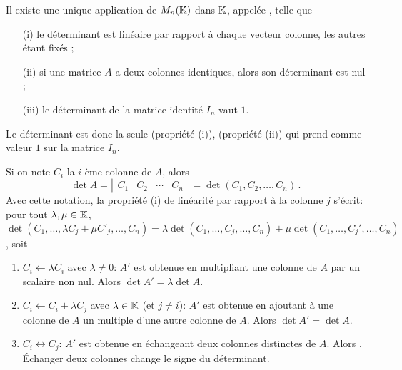 \documentclass[10pt,class=article,crop=false]{standalone}
\begin{document}
\begin{multicols}{2}
\begin{theoreme}
	\label{th:def:determinant}
	Il existe une unique application de $M_n(\mathbb{K})$ dans $\mathbb{K}$,
	appelée , telle que
	\begin{itemize}
		\item[(i)] le déterminant est linéaire par rapport à chaque
		vecteur colonne, les autres étant fixés ;
		\item[(ii)] si une matrice $A$ a deux colonnes identiques,
		alors son déterminant est nul ;
		\item[(iii)] le déterminant de la matrice identité $I_n$ vaut $1$.
	\end{itemize}
\end{theoreme}

Le déterminant est donc la seule  (propriété (i)),    (propriété (ii)) qui prend comme valeur $1$ sur la matrice
$I_n$.

Si on note $C_{i}$ la $i$-ème colonne de $A$, alors
$$\det A=\left|\begin{matrix}
	C_1&C_2&\cdots&C_n
\end{matrix}\right|
= \det (C_1,C_2,\ldots,C_n) \,.
$$
Avec cette notation, la propriété (i) de linéarité par rapport à la colonne $j$ s'écrit:
pour tout $\lambda,\mu \in \mathbb{K}$,
$\det (C_1,\ldots,\lambda C_j + \mu C'_j,\ldots, C_n)
= \lambda  \det (C_1,\ldots,C_j,\ldots, C_n)+ \mu \det (C_1,\ldots,C_j',\ldots, C_n)$, soit



\begin{proposition}
\sauteligne
\begin{enumerate}
	\item $C_i \leftarrow \lambda C_i$ avec $\lambda \neq 0$:
	$A'$ est obtenue en multipliant une colonne de $A$ par un scalaire non nul.
	Alors $\det A' = \lambda \det A$.
	
	\item $C_i \leftarrow C_i+\lambda C_j$ avec $\lambda \in \mathbb{K}$ (et $j\neq i$):
	$A'$ est obtenue en ajoutant à une colonne de $A$ un multiple d'une autre colonne de $A$.
	Alors $\det A' = \det A$.
	
	\item $C_i \leftrightarrow C_j$: $A'$ est obtenue en échangeant
	deux colonnes distinctes de $A$. Alors . \'Echanger deux colonnes change le signe du déterminant.
\end{enumerate}
\end{proposition}



\end{multicols}
\end{document}

